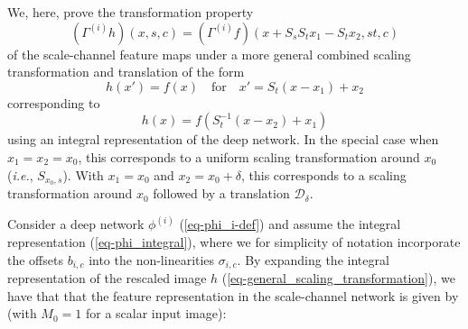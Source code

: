 \documentclass[twocolumn,runningheads]{svjour3}
\def\calD{\mathcal{D}}
\begin{document}
We, here, prove the transformation property 
\begin{equation}
(\Gamma^{(i)} h)(x, s, c)  = (\Gamma^{(i)} f)(x + S_s S_t x_1 - S_t x_2, st, c)
\end{equation}
of the scale-channel feature maps
under a more general combined scaling transformation and translation of the form
\begin{equation}
\label{eq-sc-transf-app-sc-cov-proof-noncent-offset}
h(x') = f(x) \quad \mbox{for} \quad x' = S_t (x - x_1) + x_2
\end{equation}
corresponding to
\begin{equation}
h(x) = f(S_t^{-1}(x - x_2) + x_1)
\label{eq-general_scaling_transformation}
\end{equation}
using an integral representation of the deep network.
In the special case when $x_1 = x_2 = x_0$, this corresponds to a
uniform scaling transformation around $x_0$ ({\em i.e.\/}, $S_ {x_0,s}$). 
With $x_1 = x_0$ and $x_2 = x_0 + \delta$, this
corresponds to a scaling transformation around $x_0$ followed by a
translation $\calD_\delta$. 

Consider a deep network $\phi^{(i)}$ (\ref{eq-phi_i-def}) 
and assume the integral representation (\ref{eq-phi_integral}), 
where we for simplicity of notation incorporate the offsets $b_{i,c}$ into the 
non-linearities $\sigma_{i,c}$. 
By expanding the integral representation 
of the rescaled image $h$ (\ref{eq-general_scaling_transformation}),
we have that that the feature representation in the scale-channel network is given by
 (with $M_0 = 1$ for a scalar input image):
 
\end{document}
